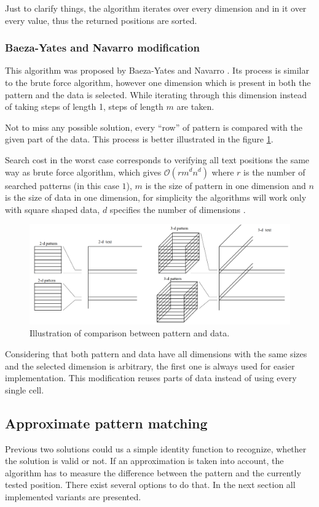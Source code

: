 Just to clarify things, the algorithm iterates over every dimension and in it over every value, thus the returned positions are sorted.

\subsubsection{Baeza-Yates and Navarro modification}\label{bynepm}
This algorithm was proposed by Baeza-Yates and Navarro \cite{mdApproxPM}. Its process is similar to the brute force algorithm, however one dimension which is present in both the pattern and the data is selected. While iterating through this dimension instead of taking steps of length 1, steps of length $m$ are taken.

Not to miss any possible solution, every ``row'' of pattern is compared with the given part of the data. This process is better illustrated in the figure \ref{fig_skipDim}.

Search cost in the worst case corresponds to verifying all text positions the same way as brute force algorithm, which gives $ \mathcal{O} (rm^dn^d)$ where $r$ is the number of searched patterns (in this case $1$), $m$ is the size of pattern in one dimension and $n$ is the size of data in one dimension, for simplicity the algorithms will work only with square shaped data, $d$ specifies the number of dimensions \cite{mdApproxPM}.

\begin{figure}
\centering
\includegraphics[width=\textwidth]{skipDim}
\caption{Illustration of comparison between pattern and data. \cite{mdApproxPM}}
\label{fig_skipDim}
\end{figure}

Considering that both pattern and data have all dimensions with the same sizes and the selected dimension is arbitrary, the first one is always used for easier implementation. This modification reuses parts of data instead of using every single cell.

\subsection{Approximate pattern matching} \label{apm}
Previous two solutions could us a simple identity function to recognize, whether the solution is valid or not. If an approximation is taken into account, the algorithm has to measure the difference between the pattern and the currently tested position. There exist several options to do that. In the next section all implemented variants are presented.

